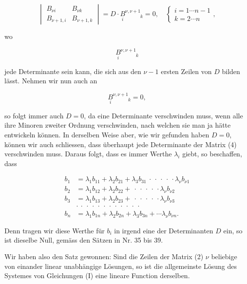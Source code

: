 \documentclass[11pt]{article}
\begin{document}
\[
\begin{vmatrix} B_{\nu i} & B_{\nu k} \\ B_{\nu+1,i} & B_{\nu+1,k} \end{vmatrix}
= D\cdot \underset{i}{\overset{}{B}}{}^{\nu,\nu+1}_{\phantom{\nu,\nu+1}k} = 0,\quad
\begin{cases} i=1\cdots n-1 \\ k=2\cdots n \end{cases},
\]

wo

\[
\underset{i}{\overset{}{B}}{}^{\nu,\nu+1}_{\phantom{\nu,\nu+1}k}
\]

jede Determinante sein kann, die sich aus den $\nu-1$ ersten Zeilen von $D$ bilden l\"asst. Nehmen wir nun auch an

\[
\underset{i}{\overset{}{B}}{}^{\nu,\nu+1}_{\phantom{\nu,\nu+1}k} = 0,
\]

so folgt immer auch $D=0$, da eine Determinante verschwinden muss, wenn alle ihre Minoren zweiter Ordnung verschwinden, nach welchen sie man ja h\"atte entwickeln k\"onnen. In derselben Weise aber, wie wir gefunden haben $D=0$, k\"onnen wir auch schliessen, dass \"uberhaupt jede Determinante der Matrix (4) verschwinden muss. Daraus folgt, dass es immer Werthe $\lambda_i$ giebt, so beschaffen, dass

\[
\begin{aligned}
b_1 &= \lambda_1 b_{11} + \lambda_2 b_{21} + \lambda_3 b_{31}\ \cdot\ \cdot\ \cdot\ \cdot\ \cdot \lambda_\nu b_{\nu 1} \\
b_2 &= \lambda_1 b_{12} + \lambda_2 b_{22} + \ \cdot\ \cdot\ \cdot\ \cdot\ \cdot \lambda_\nu b_{\nu 2} \\
b_3 &= \lambda_1 b_{13} + \lambda_2 b_{23} + \ \cdot\ \cdot\ \cdot\ \cdot\ \cdot \lambda_\nu b_{\nu 3} \\
&\cdot\ \cdot\ \cdot\ \cdot\ \cdot\ \cdot\ \cdot\ \cdot\ \cdot\ \cdot\ \cdot\ \cdot \\
b_n &= \lambda_1 b_{1n} + \lambda_2 b_{2n} + \lambda_3 b_{3n} + \cdots \lambda_\nu b_{\nu n}.
\end{aligned}
\]

Denn tragen wir diese Werthe f\"ur $b_i$ in irgend eine der Determinanten $D$ ein, so ist dieselbe Null, gem\"ass den S\"atzen in Nr. 35 bis 39.

Wir haben also den Satz gewonnen: \glqq Sind die Zeilen der Matrix (2) $\nu$ beliebige von einander linear unabh\"angige L\"osungen, so ist die allgemeinste L\"osung des Systemes von Gleichungen (I) eine lineare Function derselben.\grqq{}
\end{document}
